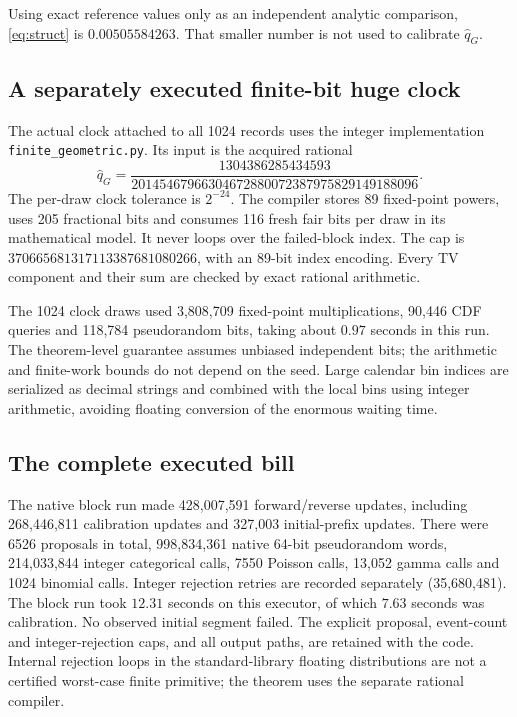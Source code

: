 Using exact reference values only as an independent analytic comparison,
\eqref{eq:struct} is $0.00505584263$. That smaller number is not used to
calibrate $\widehat q_G$.

\subsection{A separately executed finite-bit huge clock}
The actual clock attached to all 1024 records uses the integer implementation
\texttt{finite\_geometric.py}. Its input is the acquired rational
\[
\widehat q_G=
\frac{1304386285434593}
     {20145467966304672880072387975829149188096}.
\]
The per-draw clock tolerance is $2^{-24}$. The compiler stores 89 fixed-point
powers, uses 205 fractional bits and consumes 116 fresh fair bits per draw
in its mathematical model. It never loops over the failed-block index.
The cap is
$370665681317113387681080266$, with an 89-bit index encoding.
Every TV component and their sum are checked by exact rational arithmetic.

The 1024 clock draws used 3,808,709 fixed-point multiplications, 90,446 CDF
queries and 118,784 pseudorandom bits, taking about $0.97$ seconds in this
run. The theorem-level guarantee assumes unbiased independent bits;
the arithmetic and finite-work bounds do not depend on the seed.
Large calendar bin indices are serialized as decimal strings and combined
with the local bins using integer arithmetic, avoiding floating conversion
of the enormous waiting time.

\subsection{The complete executed bill}
The native block run made 428,007,591 forward/reverse updates, including
268,446,811 calibration updates and 327,003 initial-prefix updates.
There were 6526 proposals in total, 998,834,361 native 64-bit pseudorandom
words, 214,033,844 integer categorical calls, 7550 Poisson calls,
13,052 gamma calls and 1024 binomial calls. Integer rejection retries are
recorded separately (35,680,481). The block run took $12.31$ seconds on
this executor, of which $7.63$ seconds was calibration. No observed initial
segment failed. The explicit proposal, event-count and integer-rejection caps, and all
output paths, are retained with the code. Internal rejection loops in the
standard-library floating distributions are not a certified worst-case
finite primitive; the theorem uses the separate rational compiler.

